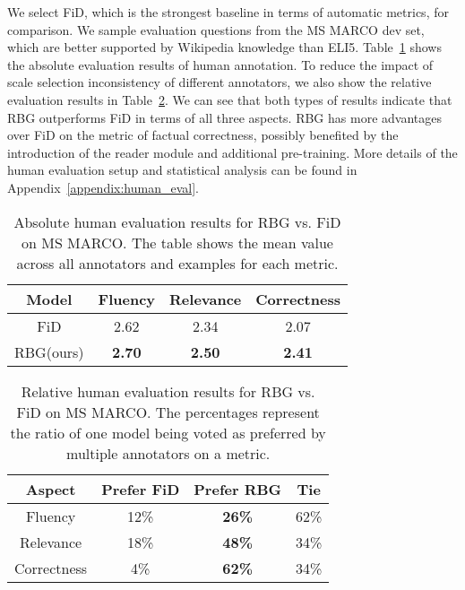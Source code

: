 \documentclass[11pt]{article}
\begin{document}
We select FiD, which is the strongest baseline in terms of automatic metrics, for comparison. We sample evaluation questions from the MS MARCO dev set, which are better supported by Wikipedia knowledge than ELI5. Table~\ref{tab:human eval abs} shows the absolute evaluation results of human annotation. To reduce the impact of scale selection inconsistency of different annotators, we also show the relative evaluation results in Table~\ref{tab:human eval rel}. We can see that both types of results indicate that RBG outperforms FiD in terms of all three aspects. RBG has more advantages over FiD on the metric of factual correctness, possibly benefited by the introduction of the reader module and additional pre-training. More details of the human evaluation setup and statistical analysis can be found in Appendix~\ref{appendix:human_eval}.


\begin{table}[]
\resizebox{0.45\textwidth}{!}
{
\begin{tabular}{c|ccc}
\hline
Model    & Fluency      & Relevance      &  Correctness   \\ \hline
FiD  &    2.62      &    2.34    &    2.07    \\
RBG(ours)   & \textbf{2.70}        & \textbf{2.50}     & \textbf{2.41} \\ \hline
\end{tabular}
}
\vspace{-4pt}
\caption{Absolute human evaluation results for RBG vs. FiD on MS MARCO. The table shows the mean value across all annotators and examples for each metric.}
\label{tab:human eval abs}
\vspace{-12pt}
\end{table}


\begin{table}[]
\resizebox{0.45\textwidth}{!}
{
\begin{tabular}{c|ccc}
\hline
Aspect    & Prefer FiD      & Prefer RBG      &  Tie  \\ \hline
Fluency  &    12\%   & \textbf{26\%}   &    62\% \\
Relevance  &  18\%     & \textbf{48\%} & 34\% \\
Correctness &  4\%     & \textbf{62\%} & 34\% \\ \hline
\end{tabular}
}
\vspace{-5pt}
\caption{Relative human evaluation results for RBG vs. FiD on MS MARCO. The percentages represent the ratio of one model being voted as preferred by multiple annotators on a metric.}
\label{tab:human eval rel}
\vspace{-12pt}
\end{table}
\end{document}

